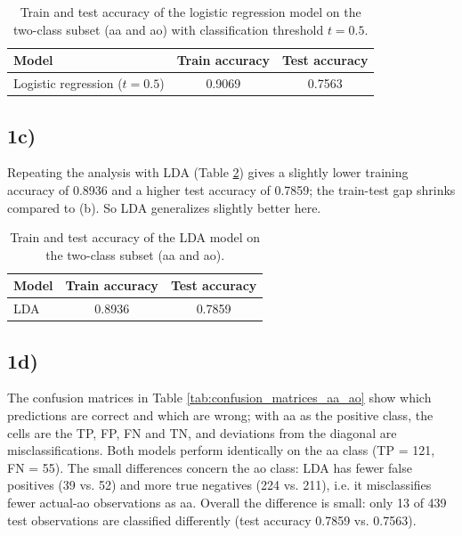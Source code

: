 \documentclass[a4paper]{scrartcl}
\begin{document}
\begin{table}[H]
  \centering
  \begin{tabular}{lcc}
    \hline
    Model & Train accuracy & Test accuracy \\ \hline
    Logistic regression ($t = 0.5$) & 0.9069 & 0.7563 \\ \hline
  \end{tabular}
  \caption{Train and test accuracy of the logistic regression model on the two-class subset (aa and ao) with classification threshold $t = 0.5$.}
  \label{tab:logistic_regression_accuracy}
\end{table}

\subsection*{1c)}

Repeating the analysis with LDA (Table \ref{tab:lda_accuracy}) gives a slightly lower training accuracy of 0.8936 and a higher test accuracy of 0.7859; the train-test gap shrinks compared to (b).
So LDA generalizes slightly better here.

\begin{table}[H]
  \centering
  \begin{tabular}{lcc}
    \hline
    Model & Train accuracy & Test accuracy \\ \hline
    LDA & 0.8936 & 0.7859 \\ \hline
  \end{tabular}
  \caption{Train and test accuracy of the LDA model on the two-class subset (aa and ao).}
  \label{tab:lda_accuracy}
\end{table}

\subsection*{1d)}

The confusion matrices in Table \ref{tab:confusion_matrices_aa_ao} show which predictions are correct and which are wrong; with aa as the positive class, the cells are the TP, FP, FN and TN, and deviations from the diagonal are misclassifications.
Both models perform identically on the aa class (TP = 121, FN = 55).
The small differences concern the ao class: LDA has fewer false positives (39 vs. 52) and more true negatives (224 vs. 211), i.e. it misclassifies fewer actual-ao observations as aa.
Overall the difference is small: only 13 of 439 test observations are classified differently (test accuracy 0.7859 vs. 0.7563).
\end{document}
